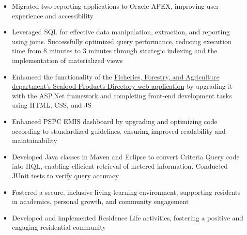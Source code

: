 \documentclass[9.5pt,a4paper]{altacv}
\begin{document}
\divider
{}

\begin{itemize}
\item Migrated two reporting applications to Oracle APEX, improving user experience and accessibility
\item Leveraged SQL for effective data manipulation, extraction, and reporting using joins. Successfully optimized query performance, reducing execution time from 8 minutes to 3 minutes through strategic indexing and the implementation of materialized views
\item Enhanced the functionality of the \href{https://www.geosurv.gov.nl.ca/fishaq/directory/}{Fisheries, Forestry, and Agriculture department's Seafood Products Directory web application} by upgrading it with the ASP.Net framework and completing front-end development tasks using HTML, CSS, and JS 
\end{itemize}

\divider


\begin{itemize}
\item Enhanced PSPC EMIS dashboard by upgrading and optimizing code according to standardized guidelines, ensuring improved readability and maintainability
\item Developed Java classes in Maven and Eclipse to convert Criteria Query code into HQL, enabling efficient retrieval of metered information. Conducted JUnit tests to verify query accuracy

\end{itemize}

\divider

\begin{itemize}
\item Fostered a secure, inclusive living-learning environment, supporting residents in academics, personal growth, and community engagement
\item Developed and implemented Residence Life activities, fostering a positive and engaging residential community
\end{itemize}

\medskip



\end{document}
